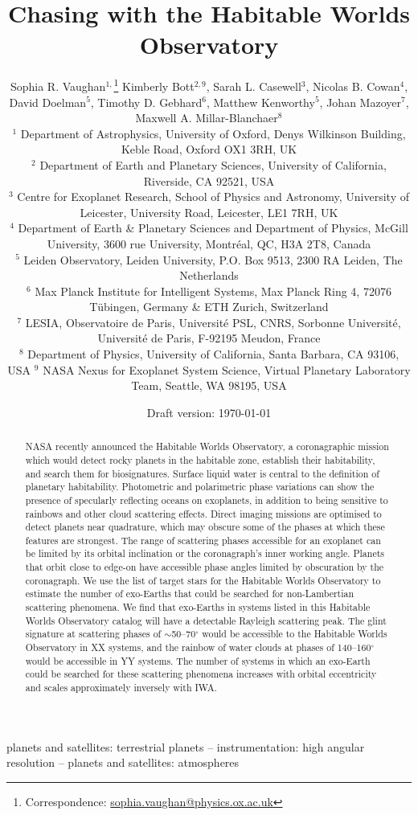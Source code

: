 \documentclass[
    usenatbib,
]{mnras}
\title{Chasing \rainbows{} with the Habitable Worlds Observatory}
\author[Sophia R. Vaughan et al.]{%
    Sophia R. Vaughan$^{1,}$\thanks{Correspondence:  \url{sophia.vaughan@physics.ox.ac.uk}}
    Kimberly Bott$^{2,9}$,
    Sarah L. Casewell$^{3}$,
    Nicolas B. Cowan$^{4}$,
    David Doelman$^{5}$,\newauthor
    Timothy D. Gebhard$^{6}$,
    Matthew Kenworthy$^{5}$,
    Johan Mazoyer$^{7}$,
    Maxwell A. Millar-Blanchaer$^{8}$
    \newauthor [remaining workshop participants in alphabetical order] \newauthor 
    \\
    $^{1}$ Department of Astrophysics, University of Oxford, Denys Wilkinson Building, Keble Road, Oxford OX1 3RH, UK\\
    $^{2}$ Department of Earth and Planetary Sciences, University of California, Riverside, CA 92521, USA \\
    $^{3}$ Centre for Exoplanet Research, School of Physics and Astronomy, University of Leicester, University Road, Leicester, LE1 7RH, UK\\
    $^{4}$ Department of Earth \& Planetary Sciences and Department of Physics, McGill University, 3600 rue University, Montréal, QC, H3A 2T8, Canada\\
    $^{5}$ Leiden Observatory, Leiden University, P.O. Box 9513, 2300 RA Leiden, The Netherlands\\
    $^{6}$ Max Planck Institute for Intelligent Systems, Max Planck Ring 4, 72076 Tübingen, Germany \& ETH Zurich, Switzerland \\
    $^{7}$ LESIA, Observatoire de Paris, Université PSL, CNRS, Sorbonne Université, Université de Paris, F-92195 Meudon, France \\
    $^{8}$ Department of Physics, University of California, Santa Barbara, CA 93106, USA 
    $^{9}$ NASA Nexus for Exoplanet System Science, Virtual Planetary Laboratory Team, Seattle, WA 98195, USA
}
\date{Draft version: \today}
\begin{document}
 

\maketitle

\begin{abstract}
NASA recently announced the Habitable Worlds Observatory, a coronagraphic mission which would detect rocky planets in the habitable zone, establish their habitability, and search them for biosignatures. 
Surface liquid water is central to the definition of planetary habitability.
%
Photometric and polarimetric phase variations can show the presence of specularly reflecting oceans on exoplanets, in addition to being sensitive to rainbows and other cloud scattering effects. Direct imaging missions are optimised to detect planets near quadrature, which may obscure some of the phases at which these features are strongest. The range of scattering phases accessible for an exoplanet can be limited by its orbital inclination or the coronagraph's inner working angle. Planets that orbit close to edge-on have accessible phase angles limited by obscuration by the coronagraph. We use the list of target stars for the Habitable Worlds Observatory to estimate the number of exo-Earths that could be searched for non-Lambertian scattering phenomena. We find that exo-Earths in systems listed in this Habitable Worlds Observatory catalog will have a detectable Rayleigh scattering peak. The glint signature at scattering phases of $\sim$50--70$^\circ$ would be accessible to the Habitable Worlds Observatory in XX systems, and the rainbow of water clouds at phases of 140--160$^\circ$ would be accessible in YY systems. The number of systems in which an exo-Earth could be searched for these scattering phenomena increases with orbital eccentricity and scales approximately inversely with IWA.       


\end{abstract}

\begin{keywords}
planets and satellites: terrestrial planets -- instrumentation: high angular resolution -- planets and satellites: atmospheres
\end{keywords}
\end{document}
